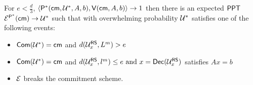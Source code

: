 \begin{theorem}
	For $e < \frac{d}{3} $, $\langle \mathsf{P}^*(\mathsf{cm}, \mathcal{U}^*, A, b),\mathsf{V}(\mathsf{cm}, A, b)\rangle \rightarrow 1 $ then there is an expected $\mathsf{PPT}$ $\mathcal{E}^{\mathsf{P}^*}(\mathsf{cm}) \rightarrow \mathcal{U}^*$ such that with overwhelming probability $\mathcal{U}^*$ satisfies one of the following events:
	\begin{itemize}
		\item $\mathsf{Com}(\mathcal{U}^*)=\mathsf{cm}$ and $d(\mathcal{U}^{\mathsf{RS}}_x,L^m) > e $
		\item $\mathsf{Com}(\mathcal{U}^*)=\mathsf{cm}$ and $d(\mathcal{U}^{\mathsf{RS}}_x, l^m)\leq e \text{ and } x = \mathsf{Dec}(\mathcal{U}^{\mathsf{RS}}_x)$ satisfies $ Ax = b$
		\item $\mathcal{E}$ breaks the commitment scheme.
	\end{itemize}
\end{theorem}

